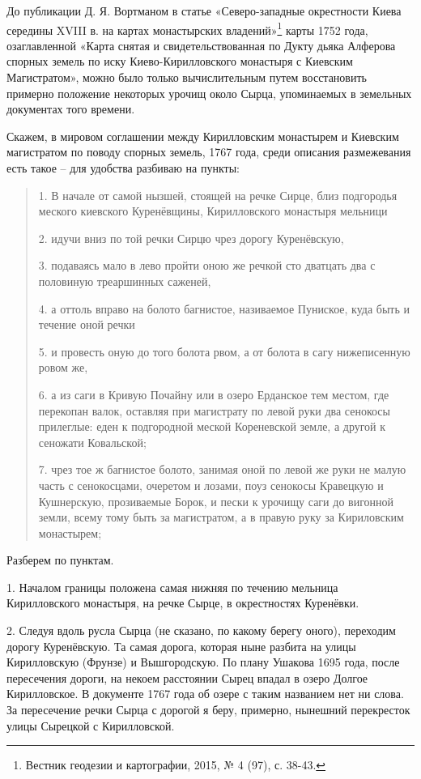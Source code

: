 До публикации Д. Я. Вортманом в статье «Северо-западные окрестности Киева середины XVIII в. на картах монастырских владений»\footnote{Вестник геодезии и картографии, 2015, № 4 (97), с. 38-43.} карты 1752 года, озаглавленной «Карта снятая и свидетельствованная по Дукту дьяка Алферова спорных земель по иску Киево-Кирилловского монастыря с Киевским Магистратом», можно было только вычислительным путем восстановить примерно положение некоторых урочищ около Сырца, упоминаемых в земельных документах того времени.

Скажем, в мировом соглашении между  Кирилловским монастырем и Киевским магистратом по поводу спорных земель, 1767 года, среди описания размежевания есть такое – для удобства разбиваю на пункты:

\begin{quotation}
1. В начале от самой нызшей, стоящей на речке Сирце, близ подгородья меского киевского Куренёвщины, Кирилловского монастыря мельници 

2. идучи вниз по той речки Сирцю чрез дорогу Куренёвскую, 

3. подаваясь мало в лево пройти оною же речкой сто дватцать два с половиную треаршинных саженей, 

4. а оттоль вправо на болото багнистое, називаемое Пуниское, куда быть и течение оной речки 

5. и провесть оную до того болота рвом, а от болота в сагу нижеписенную ровом же,

6. а из саги в Кривую Почайну или в озеро Ерданское тем местом, где перекопан валок, оставляя при магистрату по левой руки два сенокосы прилеглые: еден к подгородной меской Кореневской земле, а другой к сеножати Ковальской;

7. чрез тое ж багнистое болото, занимая оной по левой же руки не малую часть с сенокосцами, очеретом и лозами, поуз сенокосы Кравецкую и Кушнерскую, прозиваемые Борок, и пески к урочищу саги до вигонной земли, всему тому быть за магистратом, а в правую руку за Кириловским монастырем; 
\end{quotation}

Разберем по пунктам.

1. Началом границы положена самая нижняя по течению мельница Кирилловского монастыря, на речке Сырце, в окрестностях Куренёвки.

2. Следуя вдоль русла Сырца (не сказано, по какому берегу оного), переходим дорогу Куренёвскую. Та самая дорога, которая ныне разбита на улицы Кирилловскую (Фрунзе) и Вышгородскую. По плану Ушакова 1695 года, после пересечения дороги, на некоем расстоянии Сырец впадал в озеро Долгое Кирилловское. В документе 1767 года об озере с таким названием нет ни слова. За пересечение речки Сырца с дорогой я беру, примерно, нынешний перекресток улицы Сырецкой с Кирилловской.

